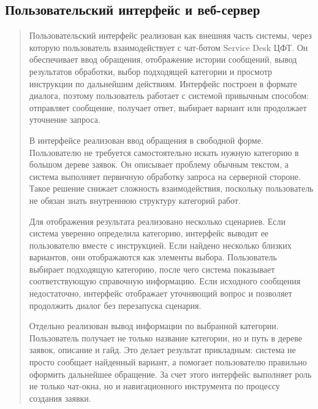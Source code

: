 \hypertarget{ux43fux43eux43bux44cux437ux43eux432ux430ux442ux435ux43bux44cux441ux43aux438ux439-ux438ux43dux442ux435ux440ux444ux435ux439ux441-ux438-ux432ux435ux431-ux441ux435ux440ux432ux435ux440}{%
\subsection{Пользовательский интерфейс и
веб-сервер}\label{ux43fux43eux43bux44cux437ux43eux432ux430ux442ux435ux43bux44cux441ux43aux438ux439-ux438ux43dux442ux435ux440ux444ux435ux439ux441-ux438-ux432ux435ux431-ux441ux435ux440ux432ux435ux440}}

\begin{quote}
Пользовательский интерфейс реализован как внешняя часть системы, через
которую пользователь взаимодействует с чат-ботом Service Desk ЦФТ. Он
обеспечивает ввод обращения, отображение истории сообщений, вывод
результатов обработки, выбор подходящей категории и просмотр инструкции
по дальнейшим действиям. Интерфейс построен в формате диалога, поэтому
пользователь работает с системой привычным способом: отправляет
сообщение, получает ответ, выбирает вариант или продолжает уточнение
запроса.

В интерфейсе реализован ввод обращения в свободной форме. Пользователю
не требуется самостоятельно искать нужную категорию в большом дереве
заявок. Он описывает проблему обычным текстом, а система выполняет
первичную обработку запроса на серверной стороне. Такое решение снижает
сложность взаимодействия, поскольку пользователь не обязан знать
внутреннюю структуру категорий работ.

Для отображения результата реализовано несколько сценариев. Если система
уверенно определила категорию, интерфейс выводит ее пользователю вместе
с инструкцией. Если найдено несколько близких вариантов, они
отображаются как элементы выбора. Пользователь выбирает подходящую
категорию, после чего система показывает соответствующую справочную
информацию. Если исходного сообщения недостаточно, интерфейс отображает
уточняющий вопрос и позволяет продолжить диалог без перезапуска
сценария.

Отдельно реализован вывод информации по выбранной категории.
Пользователь получает не только название категории, но и путь в дереве
заявок, описание и гайд. Это делает результат прикладным: система не
просто сообщает найденный вариант, а помогает пользователю правильно
оформить дальнейшее обращение. За счет этого интерфейс выполняет роль не
только чат-окна, но и навигационного инструмента по процессу создания
заявки.


\end{quote}
